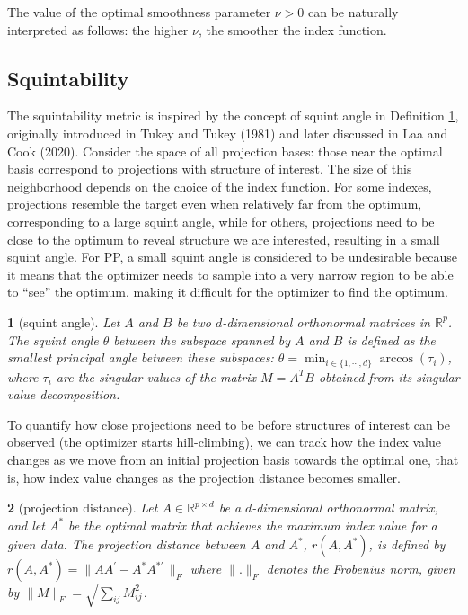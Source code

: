 \documentclass[
  12pt,
]{interact}
\theoremstyle{plain}
\newtheorem{defn}{\protect\definitionname}
\providecommand{\definitionname}{Definition}
\begin{document}
The value of the optimal smoothness parameter \(\nu>0\) can be naturally
interpreted as follows: the higher \(\nu\), the smoother the index
function.

\subsection{Squintability}\label{sec-squintability}

The squintability metric is inspired by the concept of squint angle in
Definition \ref{def:squint-angle}, originally introduced in Tukey and
Tukey (1981) and later discussed in Laa and Cook (2020). Consider the
space of all projection bases: those near the optimal basis correspond
to projections with structure of interest. The size of this neighborhood
depends on the choice of the index function. For some indexes,
projections resemble the target even when relatively far from the
optimum, corresponding to a large squint angle, while for others,
projections need to be close to the optimum to reveal structure we are
interested, resulting in a small squint angle. For PP, a small squint
angle is considered to be undesirable because it means that the
optimizer needs to sample into a very narrow region to be able to
``see'' the optimum, making it difficult for the optimizer to find the
optimum.

\begin{defn}[squint angle]\label{def:squint-angle}
Let $A$ and $B$ be two $d$-dimensional orthonormal matrices in $\mathbb{R}^p$. The squint angle $\theta$ between the subspace spanned by $A$ and $B$ is defined as the smallest principal angle between these subspaces: $\theta = \min_{i \in \{1, \cdots, d\}} \arccos(\tau_i)$, where $\tau_i$ are the singular values of the matrix $M = A^T B$ obtained from its singular value decomposition.
\end{defn}

To quantify how close projections need to be before structures of
interest can be observed (the optimizer starts hill-climbing), we can
track how the index value changes as we move from an initial projection
basis towards the optimal one, that is, how index value changes as the
projection distance becomes smaller.

\begin{defn}[projection distance]\label{def:proj-dist}
Let $A \in \mathbb{R}^{p \times d}$ be a $d$-dimensional orthonormal matrix, and let $A^*$ be the optimal matrix that achieves the maximum index value for a given data. The projection distance between $A$ 
and $A^*$, $r(A, A^*)$, is defined by
$r(A, A^*) = \lVert AA^\prime - A^*A^{*\prime}\,\rVert _F$
where $\lVert . \rVert _F$ denotes the Frobenius norm, given by
$\lVert M \rVert _F = \sqrt{\sum_{ij} M_{ij}^2}$. 
\end{defn}
\end{document}
